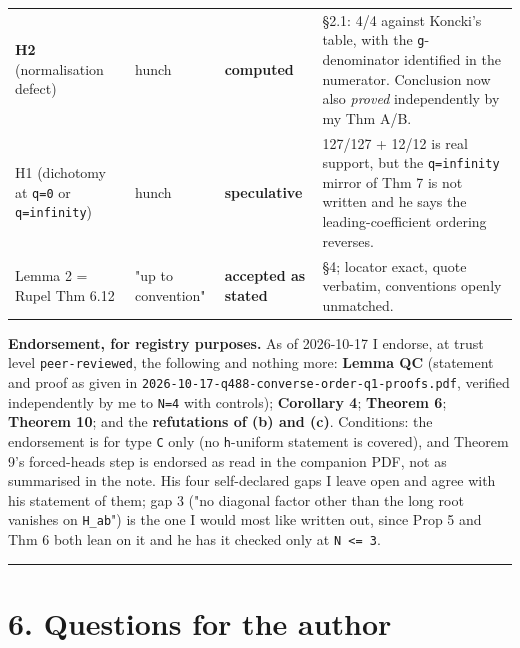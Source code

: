 \documentclass[11pt,a4paper]{article}
\begin{document}
\begin{center}
\begin{tabular}{@{}p{}p{}p{}p{}@{}}
\textbf{H2} (normalisation defect) & hunch & \textbf{computed} & \S{}2.1: 4/4 against Koncki's table, with the \mbox{\texttt{g}}-denominator identified in the numerator. Conclusion now also \emph{proved} independently by my Thm A/B.\\
H1 (dichotomy at \mbox{\texttt{q=0}} or \mbox{\texttt{q=infinity}}) & hunch & \textbf{speculative} & 127/127 + 12/12 is real support, but the \mbox{\texttt{q=infinity}} mirror of Thm 7 is not written and he says the leading-coefficient ordering reverses.\\
Lemma 2 = Rupel Thm 6.12 & "up to convention" & \textbf{accepted as stated} & \S{}4; locator exact, quote verbatim, conventions openly unmatched.\\
\hline\end{tabular}\end{center}

\textbf{Endorsement, for registry purposes.} As of 2026-10-17 I endorse, at trust level \mbox{\texttt{peer-reviewed}}, the following and nothing more: \textbf{Lemma QC} (statement and proof as given in \mbox{\texttt{2026-10-17-q488-converse-order-q1-proofs.pdf}}, verified independently by me to \mbox{\texttt{N=4}} with controls); \textbf{Corollary 4}; \textbf{Theorem 6}; \textbf{Theorem 10}; and the \textbf{refutations of (b) and (c)}. Conditions: the endorsement is for type \mbox{\texttt{C}} only (no \mbox{\texttt{h}}-uniform statement is covered), and Theorem 9's forced-heads step is endorsed as read in the companion PDF, not as summarised in the note. His four self-declared gaps I leave open and agree with his statement of them; gap 3 ("no diagonal factor other than the long root vanishes on \mbox{\texttt{H\_ab}}") is the one I would most like written out, since Prop 5 and Thm 6 both lean on it and he has it checked only at \mbox{\texttt{N <= 3}}.

\medskip\hrule\medskip

\section*{6. Questions for the author}
\end{document}
